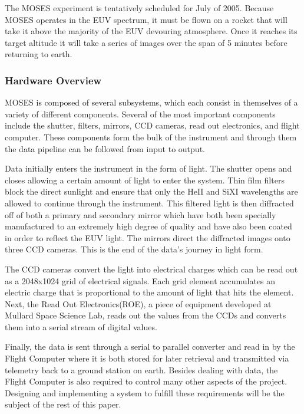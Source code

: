 \documentclass[11pt,titlepage]{article}
\begin{document}
The MOSES experiment is tentatively scheduled for July of 2005. Because MOSES operates in the EUV spectrum, it must be flown on
a rocket that will take it above the majority of the EUV devouring atmosphere. Once it reaches its target altitude it will take a series of images
over the span of 5 minutes before returning to earth.


\subsubsection{Hardware Overview}

MOSES is composed of several subsystems, which each consist in themselves of a variety of different components. Several of the most important
components include the shutter, filters, mirrors, CCD cameras, read out electronics, and flight computer. These components form the bulk of the instrument 
and through them the data pipeline can be followed from input to output.

Data initially enters the instrument in the form of light. The shutter opens and closes allowing a certain amount of light to enter the system.
Thin film filters block the direct sunlight and ensure that only the HeII and SiXI 
wavelengths are allowed to continue through the instrument. This filtered light is then diffracted off of both a primary and secondary mirror which 
have both been specially manufactured to an extremely high degree of quality and have also been coated in order to reflect the EUV light. The mirrors 
direct the diffracted images onto three CCD cameras. This is the end of the data's journey in light form.

The CCD cameras convert the light into electrical charges which can be read out as a 2048x1024 grid of electrical signals. Each grid element accumulates
an electric charge that is proportional to the amount of light that hits the element. Next, the Read Out Electronics(ROE), a piece of equipment developed
at Mullard Space Science Lab, reads out the values from the CCDs and converts them into a serial stream of digital values.

Finally, the data is sent through a serial to parallel converter and read in by the Flight Computer where it is both stored for later retrieval and 
transmitted via telemetry back to a ground station on earth. Besides dealing with data, the Flight Computer is also required to control many other
aspects of the project. Designing and implementing a system to fulfill these requirements will be the subject of the rest of this paper. 
\end{document}
